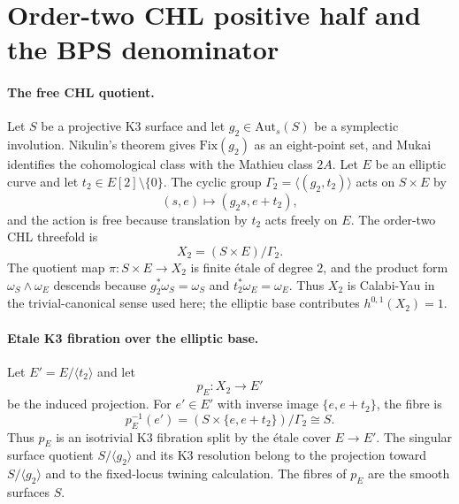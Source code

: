 \providecommand{\bC}{\mathbb{C}}
\providecommand{\bZ}{\mathbb{Z}}
\providecommand{\bQ}{\mathbb{Q}}
\providecommand{\Aut}{\mathrm{Aut}}
\providecommand{\Auts}{\mathrm{Aut}_s}
\providecommand{\Fix}{\mathrm{Fix}}
\providecommand{\DT}{\mathrm{DT}}
\providecommand{\red}{\mathrm{red}}
\providecommand{\BPS}{\mathrm{BPS}}
\providecommand{\BKM}{\mathrm{BKM}}
\providecommand{\cat}{\mathrm{cat}}
\providecommand{\ch}{\mathrm{ch}}
\providecommand{\fiber}{\mathrm{fiber}}
\providecommand{\CoHA}{\mathrm{CoHA}}
\providecommand{\Borch}{\mathrm{Borch}}
\providecommand{\wt}{\mathrm{wt}}
\providecommand{\sdim}{\mathrm{sdim}}
\providecommand{\gr}{\mathrm{gr}}
\providecommand{\cO}{\mathcal{O}}
\providecommand{\cM}{\mathcal{M}}
\providecommand{\cY}{\mathcal{Y}}
\providecommand{\cBPS}{\mathcal{BPS}}
\providecommand{\fg}{\mathfrak{g}}
\providecommand{\fn}{\mathfrak{n}}
\providecommand{\kch}{\kappa_{\mathrm{ch}}}
\providecommand{\kBKM}{\kappa_{\mathrm{BKM}}}
\providecommand{\kcat}{\kappa_{\mathrm{cat}}}
\providecommand{\kfib}{\kappa_{\mathrm{fiber}}}

\section*{Order-two CHL positive half and the BPS denominator}
\label{sec:N2-CHL-positive-half-BPS}

\paragraph{The free CHL quotient.}
Let $S$ be a projective K3 surface and let
$g_2\in\Auts(S)$ be a symplectic involution.  Nikulin's theorem gives
$\Fix(g_2)$ as an eight-point set, and Mukai identifies the cohomological
class with the Mathieu class $2A$.  Let $E$ be an elliptic curve and let
$t_2\in E[2]\setminus\{0\}$.  The cyclic group
$\Gamma_2=\langle(g_2,t_2)\rangle$ acts on $S\times E$ by
\[
  (s,e)\longmapsto (g_2s,e+t_2),
\]
and the action is free because translation by $t_2$ acts freely on $E$.
The order-two CHL threefold is
\[
  X_2=(S\times E)/\Gamma_2 .
\]
The quotient map $\pi:S\times E\to X_2$ is finite \'{e}tale of degree
$2$, and the product form $\omega_S\wedge\omega_E$ descends because
$g_2^*\omega_S=\omega_S$ and $t_2^*\omega_E=\omega_E$.  Thus $X_2$ is
Calabi-Yau in the trivial-canonical sense used here; the elliptic base
contributes $h^{0,1}(X_2)=1$.

\paragraph{Etale K3 fibration over the elliptic base.}
Let $E'=E/\langle t_2\rangle$ and let
\[
  p_E:X_2\longrightarrow E'
\]
be the induced projection.  For $e'\in E'$ with inverse image
$\{e,e+t_2\}$, the fibre is
\[
  p_E^{-1}(e')
  =
  (S\times\{e,e+t_2\})/\Gamma_2
  \cong S .
\]
Thus $p_E$ is an isotrivial K3 fibration split by the \'{e}tale cover
$E\to E'$.  The singular surface quotient $S/\langle g_2\rangle$ and
its K3 resolution belong to the projection toward $S/\langle g_2\rangle$
and to the fixed-locus twining calculation.  The fibres of $p_E$ are
the smooth surfaces $S$.

